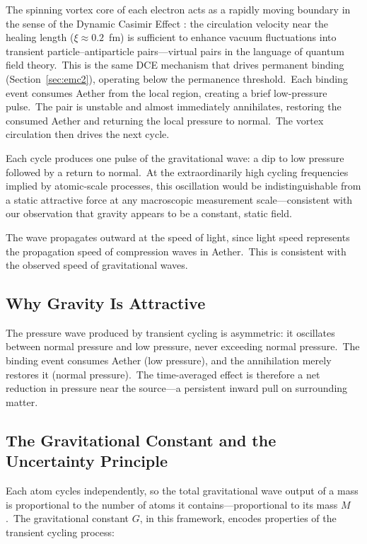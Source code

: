 ﻿\documentclass[12pt,letterpaper]{article}
\begin{document}
The spinning vortex core of each electron acts as a rapidly moving boundary in the
sense of the Dynamic Casimir Effect \cite{wilson2011}: the circulation velocity near the
healing length ($\xi \approx 0.2$~fm) is sufficient to enhance vacuum fluctuations into
transient particle--antiparticle pairs---virtual pairs in the language of quantum field
theory.\ This is the same DCE mechanism that drives permanent binding
(Section~\ref{sec:emc2}), operating below the permanence threshold.\ Each binding event
consumes Aether from the local region, creating a brief low-pressure pulse.\ The pair is
unstable and almost immediately annihilates, restoring the consumed Aether and returning
the local pressure to normal.\ The vortex circulation then drives the next cycle.

Each cycle produces one pulse of the gravitational wave: a dip to low pressure followed
by a return to normal.\ At the extraordinarily high cycling frequencies implied by atomic-scale processes, this oscillation would be indistinguishable from a static attractive force
at any macroscopic measurement scale---consistent with our observation that gravity appears
to be a constant, static field.

The wave propagates outward at the speed of light, since light speed represents the
propagation speed of compression waves in Aether.\ This is consistent with the observed
speed of gravitational waves.


\subsection{Why Gravity Is Attractive}

The pressure wave produced by transient cycling is asymmetric: it oscillates between normal
pressure and low pressure, never exceeding normal pressure.\ The binding event consumes
Aether (low pressure), and the annihilation merely restores it (normal pressure).\ The time-averaged effect is therefore a net reduction in pressure near the source---a persistent
inward pull on surrounding matter.


\subsection{The Gravitational Constant and the Uncertainty Principle}

Each atom cycles independently, so the total gravitational wave output of a mass is
proportional to the number of atoms it contains---proportional to its mass $M$.\ The
gravitational constant $G$, in this framework, encodes properties of the transient cycling
process:
\end{document}
